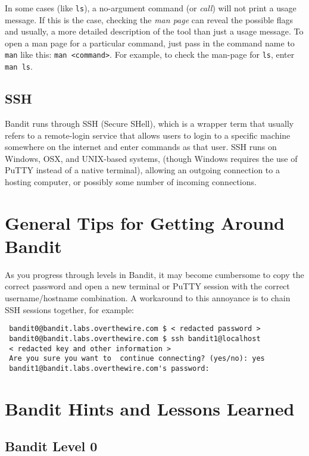 \documentclass[12pt]{article}
\begin{document}
In some cases (like \verb|ls|), a no-argument command (or \emph{call}) will not print a usage message.
If this is the case, checking the \emph{man page} can reveal the possible flags and usually, a more detailed description of the tool than just a usage message.
To open a man page for a particular command, just pass in the command name to \verb|man| like this: \verb|man <command>|.
For example, to check the man-page for \verb|ls|, enter \verb|man ls|.



\subsection{SSH}

Bandit runs through SSH (Secure SHell), which is a wrapper term that usually refers to a remote-login service that allows users to login to a specific machine somewhere on the internet and enter commands as that user.
SSH runs on Windows, OSX, and UNIX-based systems, (though Windows requires the use of PuTTY instead of a native terminal), allowing an outgoing connection to a hosting computer, or possibly some number of incoming connections.


\section{General Tips for Getting Around Bandit}


 As you progress through levels in Bandit, it may become cumbersome to copy the correct password and open a new terminal or PuTTY session with the correct username/hostname combination.
 A workaround to this annoyance is to chain SSH sessions together, for example:
 \begin{verbatim}
 bandit0@bandit.labs.overthewire.com $ < redacted password >
 bandit0@bandit.labs.overthewire.com $ ssh bandit1@localhost
 < redacted key and other information >
 Are you sure you want to  continue connecting? (yes/no): yes
 bandit1@bandit.labs.overthewire.com's password: 
 \end{verbatim}

\section{Bandit Hints and Lessons Learned}

\subsection{Bandit Level 0}
\end{document}
